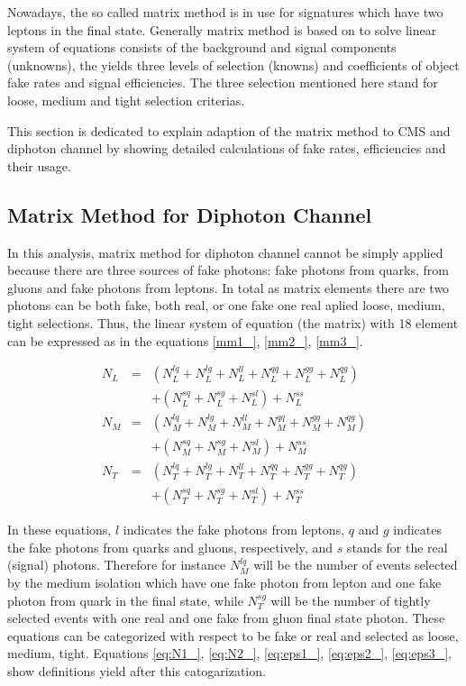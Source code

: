 \documentclass[12pt,oneandhalf,chaparabic,phys,ms,eng]{metu}
\begin{document}
Nowadays, the so called matrix method is in use for signatures which have two leptons in the final state. Generally matrix method is based on to solve linear system of equations consists of the background and signal components (unknowns),  the yields three levels of selection (knowns) and coefficients of object fake rates and signal efficiencies. The three selection mentioned here stand for loose, medium and tight selection criterias.

This section is dedicated to explain adaption of the matrix method to CMS and diphoton channel by showing detailed calculations of fake rates, efficiencies and their usage. 

\subsection{Matrix Method for Diphoton Channel}

In this analysis, matrix method for diphoton channel cannot be simply applied because there are three sources of fake photons:  fake photons from quarks, from gluons and fake photons from leptons. In total as matrix elements there are two photons can be both fake, both real, or one fake one real aplied loose, medium, tight selections. Thus, the linear system of equation (the matrix) with 18 element can be expressed as in the equations \ref{mm1_}, \ref{mm2_}, \ref{mm3_}.


\begin{eqnarray}
N_{L} & = & \left( N_{L}^{lq} + N_{L}^{lg} + N_{L}^{ll} + N_{L}^{qq} + N_{L}^{gg} + N_{L}^{qg} \right)  \nonumber \\
& & + \left( N_{L}^{sq} + N_{L}^{sg} + N_{L}^{sl} \right) + N_{L}^{ss} \label{mm1_} \\
N_{M} & = & \left( N_{M}^{lq} + N_{M}^{lg} + N_{M}^{ll} + N_{M}^{qq} + N_{M}^{gg} + N_{M}^{qg} \right)  \nonumber \\
& & + \left( N_{M}^{sq} + N_{M}^{sg} + N_{M}^{sl} \right) + N_{M}^{ss} \label{mm2_} \\
N_{T} & = & \left( N_{T}^{lq} + N_{T}^{lg} + N_{T}^{ll} + N_{T}^{qq} + N_{T}^{gg} + N_{T}^{qg} \right)  \nonumber \\
& & + \left( N_{T}^{sq} + N_{T}^{sg} + N_{T}^{sl} \right) + N_{T}^{ss} \label{mm3_}
\end{eqnarray}

In these equations, $l$ indicates the fake photons from leptons, $q$ and $g$ indicates the fake photons from quarks and gluons, respectively, and $s$ stands for the real (signal) photons. Therefore for instance $N_{M}^{lq}$ will be the number of events selected by the medium isolation which have one fake photon from lepton and one fake photon from quark in the final state, while $N_{T}^{sg}$ will be the number of tightly selected events with one real and one fake from gluon final state photon. These equations can be categorized with respect to be fake or real and selected as loose, medium, tight. Equations \ref{eq:N1_}, \ref{eq:N2_}, \ref{eq:eps1_}, \ref{eq:eps2_}, \ref{eq:eps3_}, show definitions yield after this catogarization.
\end{document}
